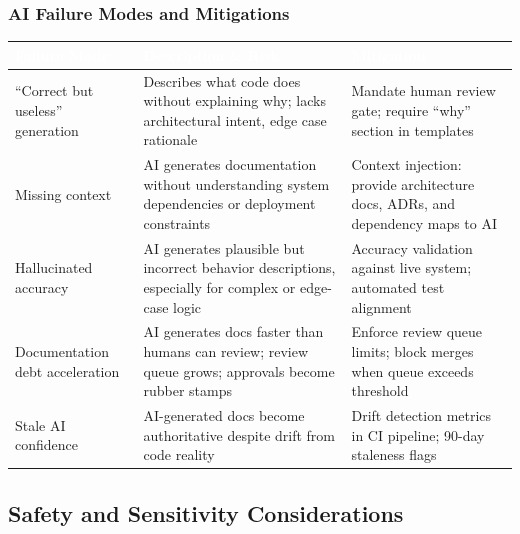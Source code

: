 \documentclass[11pt,letterpaper]{article}
\newcommand{\tableheader}[1]{\textbf{\sffamily\textcolor{white}{#1}}}
\begin{document}
\subsubsection{AI Failure Modes and Mitigations}

\begin{center}
\begin{tabularx}{\textwidth}{L{4cm}XL{3cm}}
\toprule
{}
\tableheader{Failure Mode} & \tableheader{Description \& Risk} & \tableheader{Mitigation} \\
\midrule
``Correct but useless'' generation & Describes what code does without explaining why; lacks architectural intent, edge case rationale & Mandate human review gate; require ``why'' section in templates \\
Missing context & AI generates documentation without understanding system dependencies or deployment constraints & Context injection: provide architecture docs, ADRs, and dependency maps to AI \\
Hallucinated accuracy & AI generates plausible but incorrect behavior descriptions, especially for complex or edge-case logic & Accuracy validation against live system; automated test alignment \\
Documentation debt acceleration & AI generates docs faster than humans can review; review queue grows; approvals become rubber stamps & Enforce review queue limits; block merges when queue exceeds threshold \\
Stale AI confidence & AI-generated docs become authoritative despite drift from code reality & Drift detection metrics in CI pipeline; 90-day staleness flags \\
\bottomrule
\end{tabularx}
\end{center}

\subsection{Safety and Sensitivity Considerations}
\end{document}
